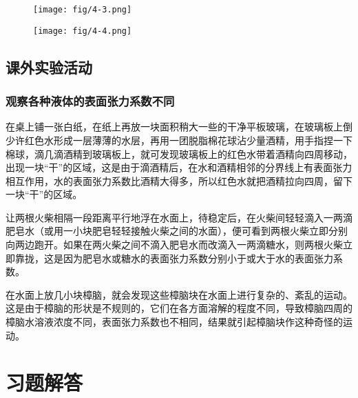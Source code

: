 \begin{figure}[htp]\centering
    \begin{minipage}[t]{0.48\textwidth}
    \centering
\texttt{[image: fig/4-3.png]}
    \caption{}
    \end{minipage}
    \begin{minipage}[t]{0.48\textwidth}
    \centering
\texttt{[image: fig/4-4.png]}
    \caption{}
    \end{minipage}
    \end{figure}

\subsection{课外实验活动}
\subsubsection{观察各种液体的表面张力系数不同}

在桌上铺一张白纸，在纸上再放一块面积稍大一些的干净平板玻璃，在玻璃板上倒少许红色水形成一层薄薄的水层，再用一团脱脂棉花球沾少量酒精，用手指捏一下棉球，滴几滴酒精到玻璃板上，就可发现玻璃板上的红色水带着酒精向四周移动，出现一块“干”的区域，这是由于滴酒精后，在水和酒精相邻的分界线上有表面张力相互作用，水的表面张力系数比酒精大得多，所以红色水就把酒精拉向四周，留下一块“干”的区域。

让两根火柴相隔一段距离平行地浮在水面上，待稳定后，在火柴间轻轻滴入一两滴肥皂水（或用一小块肥皂轻轻接触火柴之间的水面），便可看到两根火柴立即分别向两边跑开。如果在两火柴之间不滴入肥皂水而改滴入一两滴糖水，则两根火柴立即靠拢，这是因为肥皂水或糖水的表面张力系数分别小于或大于水的表面张力系数。

在水面上放几小块樟脑，就会发现这些樟脑块在水面上进行复杂的、紊乱的运动。这是由于樟脑的形状是不规则的，它们在各方面溶解的程度不同，导致樟脑四周的樟脑水溶液浓度不同，表面张力系数也不相同，结果就引起樟脑块作这种奇怪的运动。


\section{习题解答}
